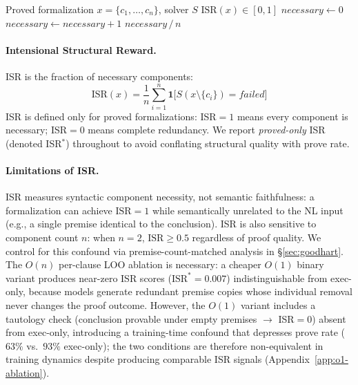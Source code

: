 \begin{algorithm}[t]
\caption{Solver Trace Ablation (STA)}
\label{alg:sta}
\begin{algorithmic}[1]
\REQUIRE Proved formalization $x = \{c_1, \ldots, c_n\}$, solver $S$
\ENSURE $\text{ISR}(x) \in [0, 1]$
\STATE $\textit{necessary} \gets 0$
        \STATE $\textit{necessary} \gets \textit{necessary} + 1$
    \ENDIF
\ENDFOR
\RETURN $\textit{necessary} \,/\, n$
\end{algorithmic}
\end{algorithm}

\paragraph{Intensional Structural Reward.}
ISR is the fraction of necessary components:
\begin{equation}
  \text{ISR}(x) = \frac{1}{n}\sum_{i=1}^{n}\mathbf{1}\bigl[S(x\setminus\{c_i\})=\textit{failed}\bigr]
  \label{eq:isr}
\end{equation}
ISR is defined only for proved formalizations: ISR${=}1$ means every component is necessary; ISR${=}0$ means complete redundancy.
We report \emph{proved-only} ISR (denoted ISR$^*$) throughout to avoid conflating structural quality with prove rate.

\paragraph{Limitations of ISR.}
ISR measures syntactic component necessity, not semantic faithfulness: a formalization can achieve $\text{ISR}{=}1$ while semantically unrelated to the NL input (e.g., a single premise identical to the conclusion).
ISR is also sensitive to component count $n$: when $n{=}2$, $\text{ISR}\geq 0.5$ regardless of proof quality.
We control for this confound via premise-count-matched analysis in \S\ref{sec:goodhart}.
The $O(n)$ per-clause LOO ablation is necessary: a cheaper $O(1)$ binary variant produces near-zero ISR scores ($\text{ISR}^*{=}0.007$) indistinguishable from exec-only, because models generate redundant premise copies whose individual removal never changes the proof outcome.
However, the $O(1)$ variant includes a tautology check (conclusion provable under empty premises $\to$ ISR${=}0$) absent from exec-only, introducing a training-time confound that depresses prove rate ($63\%$ vs.\ $93\%$ exec-only); the two conditions are therefore non-equivalent in training dynamics despite producing comparable ISR signals (Appendix~\ref{app:o1-ablation}).


